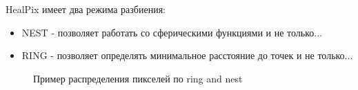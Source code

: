 \documentclass[14pt]{article} %
\begin{document}
HealPix имеет два режима разбиения:
\begin{itemize}
\item NEST - позволяет работать со сферическими функциями и не только...

\item RING - позволяет определять минимальное расстояние до точек и не только...
\end{itemize}

\begin{figure}[h]
\begin{minipage}[h]{0.48\linewidth}
\end{minipage}
\hfill
\begin{minipage}[h]{0.48\linewidth}
\end{minipage}
\caption{Пример распределения  пикселей по ring and nest}
\label{ris:moll_nside32_healpix}
\end{figure}
\end{document}
